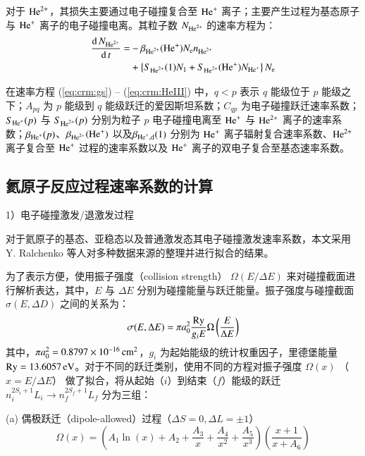 对于 ${\rm He}^{2+}$，其损失主要通过电子碰撞复合至 ${\rm He}^+$ 离子；主要产生过程为基态原子与 ${\rm He}^+$ 离子的电子碰撞电离。其粒子数 $N_{{\rm He}^{2+}}$ 的速率方程为：
\begin{equation}
\label{eq:crm:HeIII}
\begin{aligned}
\frac{{\rm d}\,N_{{\rm He}^{2+}}}{{\rm d}\,t}=
&-\beta_{{\rm He}^{2+}}({\rm He}^{+})N_{\rm e}n_{{\rm He}^{2+}}\\
&+\left\{S_{{\rm He}^{2+}}(1)N_1+S_{{\rm He}^{2+}}({\rm He}^+)N_{{\rm He}^+}\right\}N_{\rm e}
\end{aligned}
\end{equation}

在速率方程 (\ref{eq:crm:gs}) -- (\ref{eq:crm:HeIII}) 中，$q<p$ 表示 $q$ 能级位于 $p$ 能级之下；$A_{pq}$ 为 $p$ 能级到 $q$ 能级跃迁的爱因斯坦系数；$C_{qp}$ 为电子碰撞跃迁速率系数；$S_{{\rm He}^+}(p)$ 与 $S_{{\rm He}^{2+}}(p)$ 分别为粒子 $p$ 电子碰撞电离至 ${\rm He}^+$ 与 ${\rm He}^{2+}$ 离子的速率系数；$\beta_{{\rm He}^+}(p)$、$\beta_{{\rm He}^{2+}}({\rm He}^+)$ 以及$\beta_{{\rm He}^+,{\rm d}}(1)$ 分别为 ${\rm He}^+$ 离子辐射复合速率系数、${\rm He}^{2+}$ 离子复合至 ${\rm He}^+$ 过程的速率系数以及 ${\rm He}^+$ 离子的双电子复合至基态速率系数。

\subsection{氦原子反应过程速率系数的计算}

1）电子碰撞激发/退激发过程

对于氦原子的基态、亚稳态以及普通激发态其电子碰撞激发速率系数，本文采用 Y. Ralchenko 等人\cite{Ralchenko2008603,NIFS:DATA:059}对多种数据来源的整理并进行拟合的结果。

为了表示方便，使用振子强度（collision strength） $\Omega(E/\Delta E)$ 来对碰撞截面进行解析表达，其中，$E$ 与 $\Delta E$ 分别为碰撞能量与跃迁能量。振子强度与碰撞截面 $\sigma(E, \Delta D)$ 之间的关系为：
\begin{equation}
    \label{eq:chap03:col-strength-xsec}
    \sigma(E, \Delta E)=\pi a_0^2 \frac{{\rm Ry}}{g_i E}\Omega\left(\frac{E}{\Delta E}\right)
\end{equation}
其中，$\pi a_0^2=0.8797\times10^{-16}\,{\rm cm}^2$，$g_i$ 为起始能级的统计权重因子，里德堡能量 ${\rm Ry}=13.6057\,{\rm eV}$。对于不同的跃迁类别，使用不同的方程对振子强度 $\Omega(x)$ （$x=E/\Delta E$） 做了拟合，将从起始（$i$）到结束（$f$）能级的跃迁 $n_i^{2S_i+1}L_i\to n_f^{2S_f+1}L_f$ 分为三组：

(a) 偶极跃迁（dipole-allowed）过程（$\Delta S=0, \Delta L=\pm 1$）
\begin{equation}
    \Omega(x)=\left(A_1\ln(x)+A_2+\frac{A_3}{x}+\frac{A_4}{x^2}+\frac{A_5}{x^3}\right)\left(\frac{x+1}{x+A_6}\right)
\end{equation}

